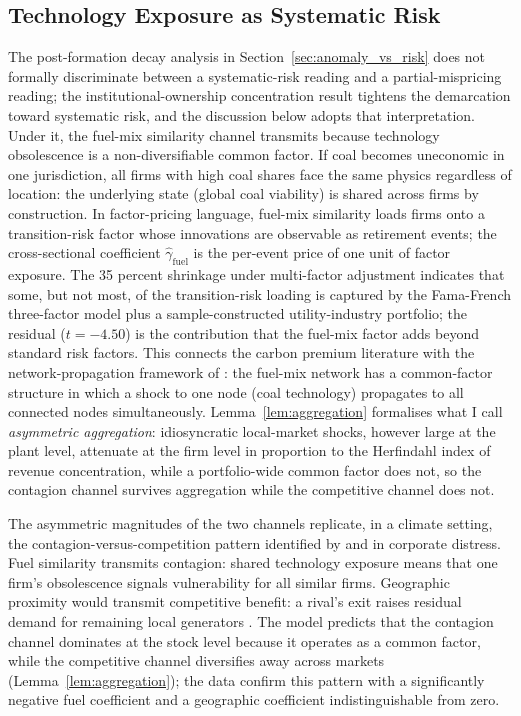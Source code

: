\documentclass[12pt,a4paper]{article}
\begin{document}
\subsection{Technology Exposure as Systematic Risk}\label{sec:systematic}

The post-formation decay analysis in Section~\ref{sec:anomaly_vs_risk} does not formally discriminate between a systematic-risk reading and a partial-mispricing reading; the institutional-ownership concentration result tightens the demarcation toward systematic risk, and the discussion below adopts that interpretation. Under it, the fuel-mix similarity channel transmits because technology obsolescence is a non-diversifiable common factor. If coal becomes uneconomic in one jurisdiction, all firms with high coal shares face the same physics regardless of location: the underlying state (global coal viability) is shared across firms by construction. In factor-pricing language, fuel-mix similarity loads firms onto a transition-risk factor whose innovations are observable as retirement events; the cross-sectional coefficient $\hat\gamma_{\mathrm{fuel}}$ is the per-event price of one unit of factor exposure. The 35 percent shrinkage under multi-factor adjustment indicates that some, but not most, of the transition-risk loading is captured by the Fama-French three-factor model plus a sample-constructed utility-industry portfolio; the residual ($t = -4.50$) is the contribution that the fuel-mix factor adds beyond standard risk factors. This connects the carbon premium literature \citep{Bolton2021, BoltonKacperczyk2023, PastorStambaughTaylor2022} with the network-propagation framework of \citet{AcemogluCarvalhoOzdaglarTahbazSalehi2012}: the fuel-mix network has a common-factor structure in which a shock to one node (coal technology) propagates to all connected nodes simultaneously. Lemma~\ref{lem:aggregation} formalises what I call \emph{asymmetric aggregation}: idiosyncratic local-market shocks, however large at the plant level, attenuate at the firm level in proportion to the Herfindahl index of revenue concentration, while a portfolio-wide common factor does not, so the contagion channel survives aggregation while the competitive channel does not.

The asymmetric magnitudes of the two channels replicate, in a climate setting, the contagion-versus-competition pattern identified by \citet{LangStulz1992} and \citet{JorionZhang2007} in corporate distress. Fuel similarity transmits contagion: shared technology exposure means that one firm's obsolescence signals vulnerability for all similar firms. Geographic proximity would transmit competitive benefit: a rival's exit raises residual demand for remaining local generators \citep{DavisHausman2016}. The model predicts that the contagion channel dominates at the stock level because it operates as a common factor, while the competitive channel diversifies away across markets (Lemma~\ref{lem:aggregation}); the data confirm this pattern with a significantly negative fuel coefficient and a geographic coefficient indistinguishable from zero.
\end{document}
